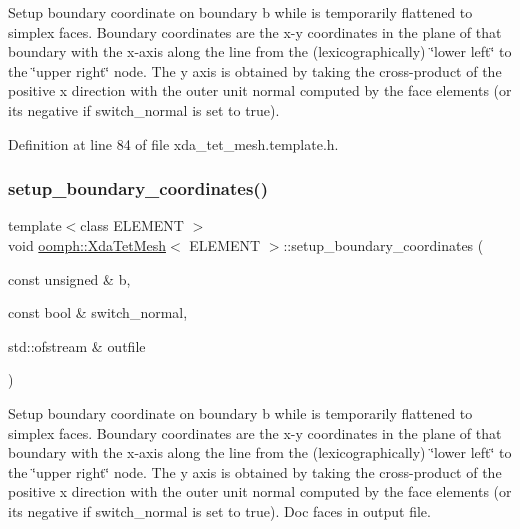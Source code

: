 Setup boundary coordinate on boundary b while is temporarily flattened to simplex faces. Boundary coordinates are the x-\/y coordinates in the plane of that boundary with the x-\/axis along the line from the (lexicographically) \char`\"{}lower left\char`\"{} to the \char`\"{}upper right\char`\"{} node. The y axis is obtained by taking the cross-\/product of the positive x direction with the outer unit normal computed by the face elements (or its negative if switch\+\_\+normal is set to true). 



Definition at line 84 of file xda\+\_\+tet\+\_\+mesh.\+template.\+h.

\mbox{\label{classoomph_1_1XdaTetMesh_a415f0211f064766f8c38bca6f877c192}} 
\subsubsection{\texorpdfstring{setup\+\_\+boundary\+\_\+coordinates()}{setup\_boundary\_coordinates()}\hspace{0.1cm}{\footnotesize\ttfamily [2/2]}}
{\footnotesize\ttfamily template$<$class E\+L\+E\+M\+E\+NT $>$ \\
void \hyperlink{classoomph_1_1XdaTetMesh}{oomph\+::\+Xda\+Tet\+Mesh}$<$ E\+L\+E\+M\+E\+NT $>$\+::setup\+\_\+boundary\+\_\+coordinates (\begin{DoxyParamCaption}\item[{const unsigned \&}]{b,  }\item[{const bool \&}]{switch\+\_\+normal,  }\item[{std\+::ofstream \&}]{outfile }\end{DoxyParamCaption})}

Setup boundary coordinate on boundary b while is temporarily flattened to simplex faces. Boundary coordinates are the x-\/y coordinates in the plane of that boundary with the x-\/axis along the line from the (lexicographically) \char`\"{}lower left\char`\"{} to the \char`\"{}upper right\char`\"{} node. The y axis is obtained by taking the cross-\/product of the positive x direction with the outer unit normal computed by the face elements (or its negative if switch\+\_\+normal is set to true). Doc faces in output file. 

